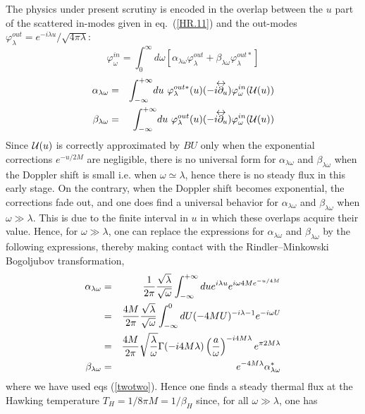 \documentclass[12pt,oneside]{report}
\def\lrpartial{{\partial\kern-.75em\raise1.75ex
\hbox{$\leftrightarrow$}}\!\!}
\def\om{\omega	}
\def\la{\lambda}
\begin{document}
The physics under present scrutiny is encoded in the overlap between
the $u$ part of the scattered in-modes 
given in eq.~(\ref{HR.11})
 and the out-modes $\varphi_\lambda ^{out}=e^{-i\lambda u}/
\sqrt{4 \pi \lambda}$:
\begin{equation}
\varphi_\omega^{in} = \int_0^\infty \! d \omega \left[
\alpha_{\la \om} \varphi_\lambda ^{out} + \beta_{\la \om}
\varphi_\lambda ^{out *}
\right]
\label{twotwobh}
\end{equation}
\begin{eqnarray}
\alpha_{\la \om} &=& \int^{+ \infty}_{-\infty} 
\! du\ \varphi_{\la}^{out *}(u) (-i\lrpartial_u)
\varphi_\omega^{in} ({{\cal{U}}(u)})
\nonumber\\
 \beta_{\la \om} &=& \int^{+ \infty}_{-\infty}
 \! du\ \varphi_{\la}^{out} (u) 
(-i\lrpartial_u)\varphi_\omega^{in} ({{\cal{U}}(u)})
\label{alphabh}
\end{eqnarray}
Since ${{\cal{U}}(u)}$ is correctly approximated by $BU$ only when the 
exponential corrections $e^{-u/2M}$ are negligible, there is no universal
form for $\alpha_{\la \om}$ and $\beta_{\la \om}$ when the Doppler shift is
small i.e. when $\om \simeq \la$, hence there is no steady flux in this
early stage. On the contrary, when the Doppler shift becomes  exponential,
the corrections fade out, and one does find a universal behavior
for $\alpha_{\la \om}$ and $\beta_{\la \om}$ when $\om \gg  \la$. This is due to the 
finite interval in $u$ in which these overlaps acquire their value.
Hence, for $\om \gg  \la$, one can replace the expressions for 
$\alpha_{\la \om}$ and $\beta_{\la \om}$ by the following expressions,
thereby making contact with the Rindler--Minkowski Bogoljubov transformation, 
\begin{eqnarray}
\alpha_{\la \om} &=& {1 \over 2\pi} { \sqrt{ \lambda} \over \sqrt{\omega}}
\int^{+ \infty}_{-\infty}
 du e^{i \lambda u} e^{i \omega 4M e^{-u/4M}} \nonumber\\
 &=& { 4M \over 2\pi} { \sqrt{ \lambda} \over \sqrt{\omega}} \int^0_{-\infty}
dU (-4MU)^{-i \lambda -1} e^{-i \omega U} \nonumber\\
 &=& {4M \over 2 \pi } \sqrt{\la \over \om}
\Gamma(-i4M \la)
\left( {a \over \om} \right)^{-i4M \la}
e^{\pi 2M \la }\nonumber\\ 
\beta_{\la \om} &=& 
 e^{- 4M\la} \alpha_{\la \om}^*
\label{alphabh2}
\end{eqnarray}
where we have used eqs (\ref{twotwo}).
Hence one finds 
a
steady thermal flux at the Hawking temperature $T_H= 1/ 8\pi M = 1/\beta_H$
since, for all $\om \gg  \la$, one has
\end{document}

